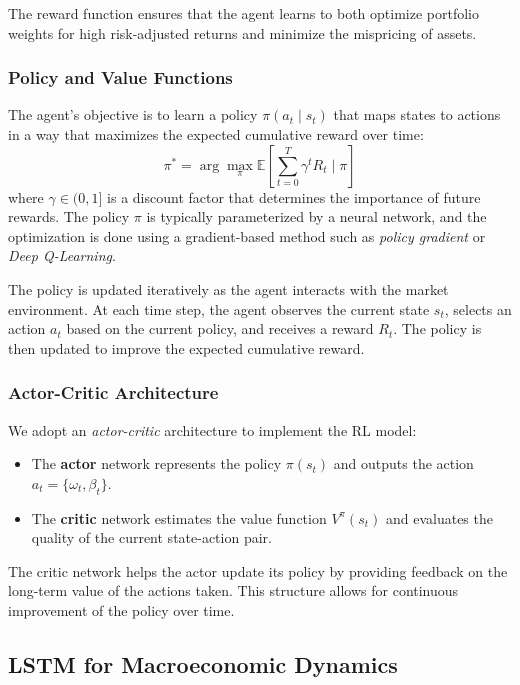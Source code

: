 The reward function ensures that the agent learns to both optimize portfolio weights for high risk-adjusted returns and minimize the mispricing of assets.

\subsubsection{Policy and Value Functions}

The agent's objective is to learn a policy $\pi(a_t \mid s_t)$ that maps states to actions in a way that maximizes the expected cumulative reward over time:
\[
\pi^* = \arg \max_{\pi} \mathbb{E}\left[\sum_{t=0}^T \gamma^t R_t \mid \pi \right]
\]
where $\gamma \in (0, 1]$ is a discount factor that determines the importance of future rewards. The policy $\pi$ is typically parameterized by a neural network, and the optimization is done using a gradient-based method such as \textit{policy gradient} or \textit{Deep Q-Learning}.

The policy is updated iteratively as the agent interacts with the market environment. At each time step, the agent observes the current state $s_t$, selects an action $a_t$ based on the current policy, and receives a reward $R_t$. The policy is then updated to improve the expected cumulative reward.

\subsubsection{Actor-Critic Architecture}

We adopt an \textit{actor-critic} architecture to implement the RL model:
\begin{itemize}
    \item The \textbf{actor} network represents the policy $\pi(s_t)$ and outputs the action $a_t = \{ \omega_t, \beta_t \}$.
    \item The \textbf{critic} network estimates the value function $V^\pi(s_t)$ and evaluates the quality of the current state-action pair.
\end{itemize}

The critic network helps the actor update its policy by providing feedback on the long-term value of the actions taken. This structure allows for continuous improvement of the policy over time.

\subsection{LSTM for Macroeconomic Dynamics}

